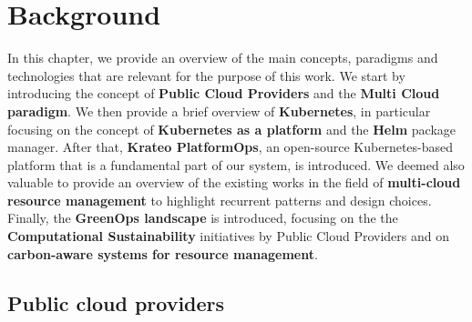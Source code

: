 \chapter{Background}
\label{cha:background}

In this chapter, we provide an overview of the main concepts, paradigms and technologies that are relevant for the purpose of this work.
We start by introducing the concept of \textbf{Public Cloud Providers} and the \textbf{Multi Cloud paradigm}.
We then provide a brief overview of \textbf{Kubernetes}, in particular focusing on the concept of \textbf{Kubernetes as a platform} and the \textbf{Helm} package manager.
After that, \textbf{Krateo PlatformOps}, an open-source Kubernetes-based platform that is a fundamental part of our system, is introduced.
We deemed also valuable to provide an overview of the existing works in the field of \textbf{multi-cloud resource management} to highlight recurrent patterns and design choices.
Finally, the \textbf{GreenOps landscape} is introduced, focusing on the the \textbf{Computational Sustainability} initiatives by Public Cloud Providers and on \textbf{carbon-aware systems for resource management}. 

\section{Public cloud providers}

